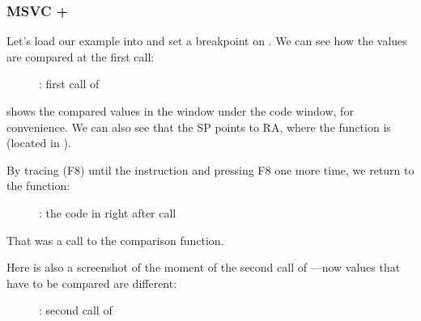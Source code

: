 ﻿\clearpage
\subsubsection{MSVC + \olly}
\myindex{\olly}

Let's load our example into \olly and set a breakpoint on \comp.
We can see how the values are compared at the first \comp call:

\begin{figure}[H]
\centering
{}
\caption{\olly: first call of \comp}
\label{fig:qsort_olly1}
\end{figure}

\olly shows the compared values in the window under the code window, for convenience.
We can also see that the \ac{SP} points to \ac{RA}, where the \qsort function is (located in ).

\clearpage
By tracing (F8) until the  instruction and pressing F8 one more time, we return to the \qsort function:

\begin{figure}[H]
\centering
{}
\caption{\olly: the code in \qsort right after \comp call}
\label{fig:qsort_olly2}
\end{figure}

That was a call to the comparison function.

\clearpage
Here is also a screenshot of the moment of the second call of \comp{}---now values that have to be compared are different:

\begin{figure}[H]
\centering
{}
\caption{\olly: second call of \comp}
\label{fig:qsort_olly3}
\end{figure}
